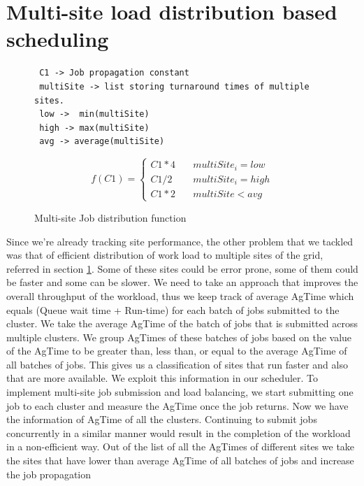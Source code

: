 \documentclass[ms,electronic,double]{nuthesis}
\begin{document}
\section{Multi-site load distribution based scheduling} 
 \begin{figure}[htbp!]
   
 \begin{verbatim}
 C1 -> Job propagation constant
 multiSite -> list storing turnaround times of multiple sites.
 low ->  min(multiSite)  
 high -> max(multiSite)
 avg -> average(multiSite)
 \end{verbatim}

$$
f(C1) = \left\{
        \begin{array}{ll}
            C1*4 & \quad multiSite_i = low\\ 
            C1/2 & \quad multiSite_i = high \\
            C1*2 & \quad multiSite < avg
        \end{array}
    \right.
$$

\caption{Multi-site Job distribution function}
  \label{fig:multiSite2}

\end{figure}
Since we're already tracking site performance, the other problem that we tackled was that of efficient distribution of work load to multiple sites of the 
grid, referred in section \ref{fig:multiSite2}.
Some of these sites could be error prone, some of them could be faster and some can be slower. We need to
take an approach that improves the overall throughput of the workload, thus we keep track of average AgTime which equals (Queue wait time + Run-time) for each batch of jobs submitted to the cluster. 
We take the average AgTime of the batch of jobs that is submitted 
 across multiple clusters. We group AgTimes of these batches of jobs based on the value of the 
 AgTime to be greater than, less than, or equal to the average AgTime of all batches of jobs.
 This gives us a classification of sites that run faster and also that are more available. We exploit this information in our scheduler. 
 To implement multi-site job submission and load balancing, we start submitting one job to each cluster 
 and measure the AgTime once the job returns. Now we have the information of AgTime of all the clusters. Continuing to submit jobs concurrently in a similar manner
  would result in the completion of
 the workload in a non-efficient way. Out of the list of all the AgTimes of different sites we take the 
 sites
 that have lower than average AgTime of all batches of jobs and increase the job propagation 
\end{document}
